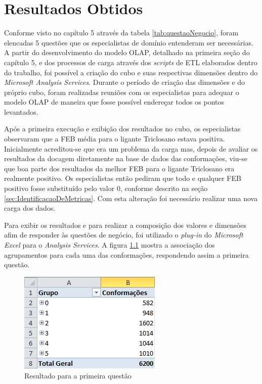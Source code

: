 \chapter{Resultados Obtidos}
\label{cap:ResultadosObtidos}

Conforme visto no capítulo 5 através da tabela \ref{tab:questaoNegocio}, foram elencadas 5 questões que os especialistas de domínio entenderam ser necessárias. A partir do desenvolvimento do modelo OLAP, detalhado na primeira seção do capítulo 5, e dos processos de carga através dos \emph{scripts} de ETL elaborados dentro do trabalho, foi possível a criação do cubo e suas respectivas dimensões dentro do \emph{Microsoft Analysis Services}. Durante o período de criação das dimensões e do próprio cubo, foram realizadas reuniões com os especialistas para adequar o modelo OLAP de maneira que fosse possível endereçar todos os pontos levantados. 

Após a primeira execução e exibição dos resultados no cubo, os especialistas observaram que a FEB média para o ligante Triclosano estava positiva. Inicialmente acreditou-se que era um problema da carga mas, depois de avaliar os resultados da docagem diretamente na base de dados das conformações, viu-se que boa parte dos resultados da melhor FEB para o ligante Triclosano era realmente positivo. Os especialistas então pediram que todo e qualquer FEB positivo fosse substituído pelo valor 0, conforme descrito na seção \ref{sec:IdentificacaoDeMetricas}. Com esta alteração foi necessário realizar uma nova carga dos dados.

Para exibir os resultados e para realizar a composição dos valores e dimensões afim de responder às questões de negócio, foi utilizado o \emph{plug-in} do \emph{Microsoft Excel} para o \emph{Analysis Services}. A figura \ref{fig:questao1} mostra a associação dos agrupamentos para cada uma das conformações, respondendo assim a primeira questão. 

\begin{figure}[h]
        \center
        \includegraphics[scale=0.8]{images/Questao1.PNG}
        \caption{Resultado para a primeira questão}
        \label{fig:questao1}
\end{figure}

